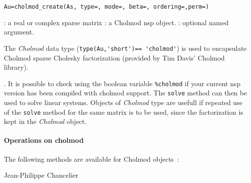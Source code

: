 
\begin{mandesc}
\end{mandesc}

\begin{calling_sequence}
\begin{verbatim}
Au=cholmod_create(As, type=, mode=, beta=, ordering=,perm=)
\end{verbatim}
\end{calling_sequence}
\begin{parameters}
  \begin{varlist}
    : a real or complex sparse matrix
    : a Cholmod nsp object.
    : optional named argument. 
  \end{varlist}
\end{parameters}

\begin{mandescription}
The \emph{Cholmod} data type (\verb+type(Au,'short')== 'cholmod'+) is used to 
encapsulate Cholmod sparse Cholesky factorization (provided by Tim Davis' Cholmod library). 
\end{mandescription}. It is possible to check using the boolean variable \verb+%cholmod+ 
if your current nsp version has been compiled with cholmod support. The \verb+solve+ method 
can then be used to solve linear systems. Objects of \emph{Cholmod} type are usefull if 
repeated use of the \verb+solve+ method for the same matrix is to be used, 
since the factorization is kept in the \emph{Cholmod} object. 
\paragraph{Operations on cholmod}
The following methods are available for Cholmod objects~:
\begin{varlist}
\end{varlist}

\begin{examples}
  \begin{program} 
  \end{program}
 \end{examples}

\begin{authors}
  Jean-Philippe Chancelier
\end{authors}
